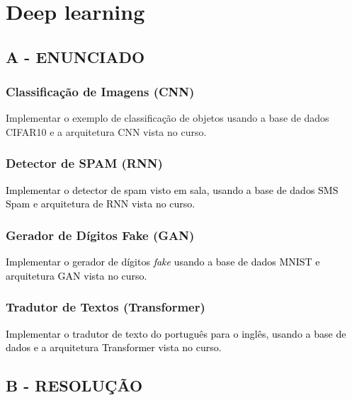 \label{ap:ap09}
\chapter{Deep learning}
\section*{\textbf{A - ENUNCIADO}}

\subsection{Classificação de Imagens (CNN)}



Implementar o exemplo de classificação de objetos usando a base de dados CIFAR10 e a arquitetura CNN vista no curso.



\subsection{Detector de SPAM (RNN)}



\textcolor{black}{Implementar o detector de spam visto em sala, usando a base de dados SMS Spam e arquitetura de RNN
vista no curso.}



\subsection{Gerador de Dígitos Fake (GAN)}



\textcolor{black}{Implementar o gerador de dígitos }\textit{\textcolor{black}{fake}}\textcolor{black}{ usando a base de
dados MNIST e arquitetura GAN vista no curso.}



\subsection{Tradutor de Textos (Transformer)}



\textcolor{black}{Implementar o tradutor de texto do português para o inglês, usando a base de dados e a arquitetura
Transformer vista no curso.}

\section*{\textbf{B - RESOLUÇÃO}}
\lipsum[30]